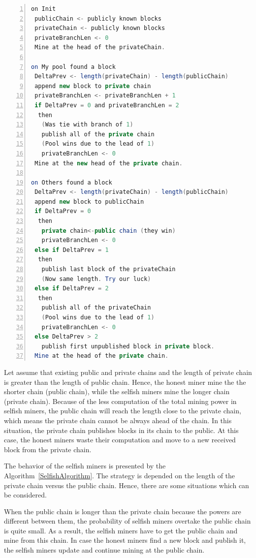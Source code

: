 \documentclass[runningheads,a4paper]{llncs}
\begin{document}
\begin{lstlisting}[numbers=left,language=Java,frame=single,breaklines=false,label=SelfishAlgorithm, caption= Selfish-Mine algorithm~\cite{eyal2014majority}.]
on Init
 publicChain <- publicly known blocks
 privateChain <- publicly known blocks
 privateBranchLen <- 0
 Mine at the head of the privateChain.

on My pool found a block
 DeltaPrev <- length(privateChain) - length(publicChain)
 append new block to private chain
 privateBranchLen <- privateBranchLen + 1
 if DeltaPrev = 0 and privateBranchLen = 2 
  then 
   (Was tie with branch of 1)
   publish all of the private chain 
   (Pool wins due to the lead of 1)
   privateBranchLen <- 0
 Mine at the new head of the private chain.

on Others found a block
 DeltaPrev <- length(privateChain) - length(publicChain)
 append new block to publicChain
 if DeltaPrev = 0 
  then 
   private chain<-public chain (they win)
   privateBranchLen <- 0
 else if DeltaPrev = 1 
  then 
   publish last block of the privateChain 
   (Now same length. Try our luck)
 else if DeltaPrev = 2 
  then
   publish all of the privateChain 
   (Pool wins due to the lead of 1)
   privateBranchLen <- 0
 else DeltaPrev > 2
   publish first unpublished block in private block.
 Mine at the head of the private chain.
\end{lstlisting}


Let assume that existing public and private chains and the length of private chain is greater than the length of public chain.
Hence, the honest miner mine the the shorter chain (public chain), while the selfish miners mine the longer chain (private chain).
Because of the less computation of the total mining power in selfish miners, the public chain will reach the length close to the private chain, which means the private chain cannot be always ahead of the chain.
In this situation, the private chain publishes blocks in its chain to the public.
At this case, the honest miners waste their computation and move to a new received block from the private chain.

The behavior of the selfish miners is presented by the Algorithm~\ref{SelfishAlgorithm}.
The strategy is depended on the length of the private chain versus the public chain.
Hence, there are some situations which can be considered.

When the public chain is longer than the private chain because the powers are different between them, the probability of selfish miners overtake the public chain is quite small. 
As a result, the selfish miners have to get the public chain and mine from this chain.
In case the honest miners find a new block and publish it, the selfish miners update and continue mining at the public chain.
\end{document}
